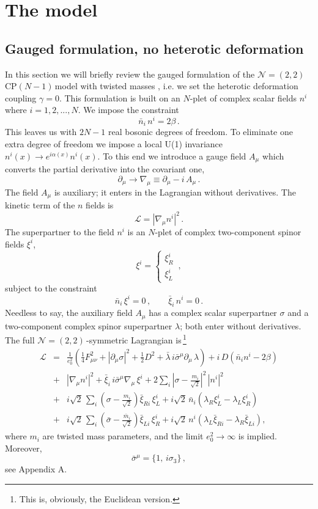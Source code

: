 \documentclass[epsfig,12pt]{article}
\def\beq{\begin{equation}}
\def\eeq{\end{equation}}
\def\beqn{\begin{eqnarray}}
\def\eeqn{\end{eqnarray}}
\newcommand{\ntt}{${\mathcal N}=(2,2)\,$}
\newcommand{\cpn}{CP$(N-1)\,$}
\newcommand{\cell}{{\mathcal L}}
\newcommand{\pt}{\partial}
\def\beqn{\begin{eqnarray}}
\def\eeqn{\end{eqnarray}}
\def\beq{\begin{equation}}
\def\eeq{\end{equation}}
\begin{document}
\section{The model}
\setcounter{equation}{0}

\subsection{Gauged formulation, no heterotic deformation}

In this section we will briefly review the gauged formulation \cite{W79,W93} of
the \mbox{\ntt} \cpn model with twisted masses
\cite{twisted}, i.e. we set the heterotic deformation coupling
$\gamma = 0$.
This formulation is built on an $N$-plet of complex scalar fields $n^i$ where $i=1,2,...,N$.
We impose the constraint
\beq
\bar n_i \,n^i = 2\beta \,.
\eeq
This leaves us with $2N-1$ real bosonic degrees of freedom. To eliminate one extra degree
of freedom we impose a local U(1) invariance $n^i(x)\to e^{i\alpha(x)} n^i(x)$.
To this end we introduce a gauge field $A_\mu$ which converts the partial derivative into the
covariant one,
\beq
\partial_\mu\to \nabla_\mu \equiv \partial_\mu -i\,  A_\mu\,.
\eeq
The field $A_\mu$ is auxiliary; it enters in the Lagrangian without derivatives. The kinetic term of the
$n$ fields is
\beq
\cell  = \left|\nabla_\mu n^i\right|^2\,.
\eeq
The superpartner to the field $n^i$ is an $N$-plet of complex two-component spinor fields $\xi^i$,
\beq
\xi^i =\left\{\begin{array}{l}
\xi^i_R\\[2mm]
\xi^i_L
\end{array}
\right.\,,
\eeq
subject to the constraint
\beq
\bar{n}_i\,\xi^i =0\,,\qquad \bar\xi_i\,n^i = 0\,.
\label{npxi}
\eeq
Needless to say, the auxiliary field $A_\mu$ has a complex scalar superpartner $\sigma$ 
and a two-component complex spinor superpartner $\lambda$; both enter without derivatives.
The full \ntt-symmetric Lagrangian is\,\footnote{This is, obviously, the Euclidean version.}
\beqn
\cell &=& 
\frac{1}{e_0^2}\left(\frac{1}{4} F_{\mu\nu}^2 +\left|\pt_\mu\sigma\right|^2 + \frac{1}{2}D^2
+\bar\lambda \, i\bar{\sigma}^\mu\pt_\mu\,\lambda
\right) + i\,D\left(\bar{n}_i n^i -2\beta
\right)
\nonumber\\[3mm]
&+&
\left|\nabla_\mu n^i\right|^2+ \bar{\xi}_i\, i\bar{\sigma}^\mu\nabla_\mu\,\xi^i
+ 2\sum_i\left|\sigma-\frac{m_i}{\sqrt 2}\right|^2\, |n^i|^2
\nonumber\\[3mm]
&+&
i\sqrt{2}\,\sum_i \left( \sigma -\frac{m_i}{\sqrt 2}\right)\bar\xi_{Ri}\, \xi^i_L +i\sqrt{2}\,\bar{n}_i
\left(\lambda_R\xi^i_L - \lambda_L\xi^i_R
\right)
\nonumber\\
&+&
i\sqrt{2}\,\sum_i \left( \bar\sigma -\frac{\bar{m}_i}{\sqrt 2}\right)\bar\xi_{Li}\, \xi^i_R +i\sqrt{2}\,{n}^i
\left(\lambda_L\bar\xi_{Ri} - \lambda_R\bar\xi_{Li}
\right),
\label{bee31}
\eeqn
where $m_i$ are twisted mass parameters, and the limit $e_0^2\to\infty$ is implied. 
Moreover,
\beq
\bar\sigma^\mu = \{1,\,i\sigma_3\}\,,
\label{wtpi3}
\eeq
see Appendix A.
\end{document}
